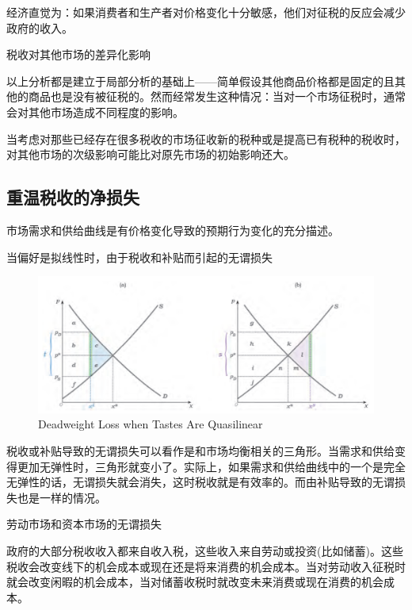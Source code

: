 \documentclass{article}
\begin{document}
经济直觉为：如果消费者和生产者对价格变化十分敏感，他们对征税的反应会减少政府的收入。

\hspace*{\fill}

税收对其他市场的差异化影响

以上分析都是建立于局部分析的基础上——简单假设其他商品价格都是固定的且其他的商品也是没有被征税的。然而经常发生这种情况：当对一个市场征税时，通常会对其他市场造成不同程度的影响。

当考虑对那些已经存在很多税收的市场征收新的税种或是提高已有税种的税收时，对其他市场的次级影响可能比对原先市场的初始影响还大。

\subsection{重温税收的净损失}
市场需求和供给曲线是有价格变化导致的预期行为变化的充分描述。

\hspace*{\fill}

当偏好是拟线性时，由于税收和补贴而引起的无谓损失

\begin{figure}[H] %
	\centering %
	\includegraphics[width=1\textwidth]{19_4} %
	\caption{Deadweight Loss when Tastes Are Quasilinear} %
	\label{Fig.main5} %
\end{figure}

税收或补贴导致的无谓损失可以看作是和市场均衡相关的三角形。当需求和供给变得更加无弹性时，三角形就变小了。实际上，如果需求和供给曲线中的一个是完全无弹性的话，无谓损失就会消失，这时税收就是有效率的。而由补贴导致的无谓损失也是一样的情况。

\hspace*{\fill}

劳动市场和资本市场的无谓损失

政府的大部分税收收入都来自收入税，这些收入来自劳动或投资(比如储蓄)。这些税收会改变线下的机会成本或现在还是将来消费的机会成本。当对劳动收入征税时就会改变闲暇的机会成本，当对储蓄收税时就改变未来消费或现在消费的机会成本。
\end{document}
